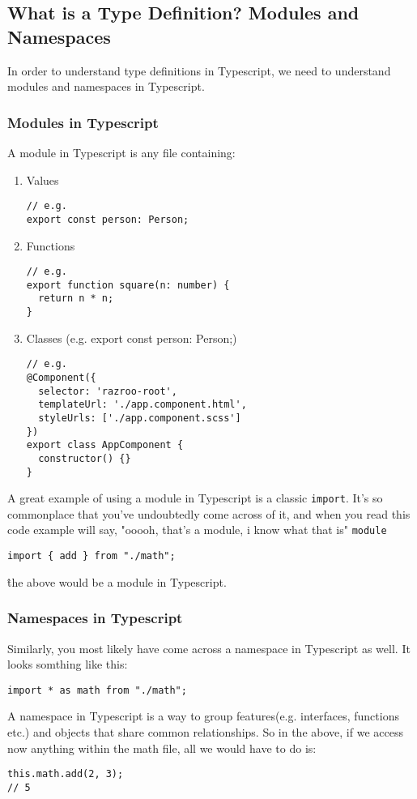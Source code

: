 \subsection{What is a Type Definition? Modules and Namespaces}
In order to understand type definitions in Typescript, we need to understand modules and namespaces in Typescript. 
\subsubsection{Modules in Typescript}
A module in Typescript is any file containing: 
\begin{enumerate}
  \item Values 
\begin{verbatim}
// e.g.  
export const person: Person;  
\end{verbatim}  
\item Functions
\begin{verbatim}
// e.g. 
export function square(n: number) {
  return n * n;
}
\end{verbatim}
\item Classes (e.g. export const person: Person;)
\begin{verbatim}
// e.g.
@Component({
  selector: 'razroo-root',
  templateUrl: './app.component.html',
  styleUrls: ['./app.component.scss']
})
export class AppComponent {
  constructor() {}
}
\end{verbatim}
\end{enumerate}

A great example of using a module in Typescript is a classic \lstinline{import}. It's so commonplace that you've undoubtedly come across of it, and when you read this code example will say, "ooooh, that's a module, i know what that is" \lstinline{module}
\begin{lstlisting}
import { add } from "./math";
\end{lstlisting}

\^ the above would be a module in Typescript.

\subsubsection{Namespaces in Typescript}
Similarly, you most likely have come across a namespace in Typescript as well. It looks somthing like this:
\begin{lstlisting}
import * as math from "./math";
\end{lstlisting}
A namespace in Typescript is a way to group features(e.g. interfaces, functions etc.) and objects that share common relationships. So in the above, if we access now anything within the math file, all we would have to do is:
\begin{verbatim}
this.math.add(2, 3);
// 5  
\end{verbatim}

